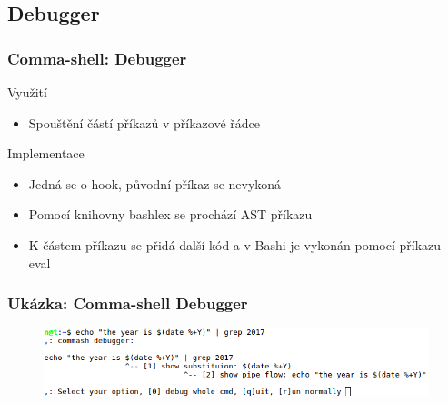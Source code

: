 \documentclass{beamer}
\begin{document}
\subsection{Debugger}
\begin{frame}
	\frametitle{Comma-shell: Debugger}
	
	\begin{exampleblock}{Využití}
		\begin{itemize}
			\item Spouštění částí příkazů v příkazové řádce
		\end{itemize}
	\end{exampleblock}		
	
	
	\begin{exampleblock}{Implementace}
		\begin{itemize}
			\item Jedná se o hook, původní příkaz se nevykoná
			\item Pomocí knihovny bashlex se prochází AST příkazu
			\item K částem příkazu se přidá další kód a v Bashi je vykonán pomocí příkazu eval 
		\end{itemize}
	\end{exampleblock}		
\end{frame}

\begin{frame}
	\frametitle{Ukázka: Comma-shell Debugger}
	\begin{figure}
		\centering
		\includegraphics[width=1.0\textwidth]{./images/debugger}
	\end{figure}
\end{frame}
\end{document}
